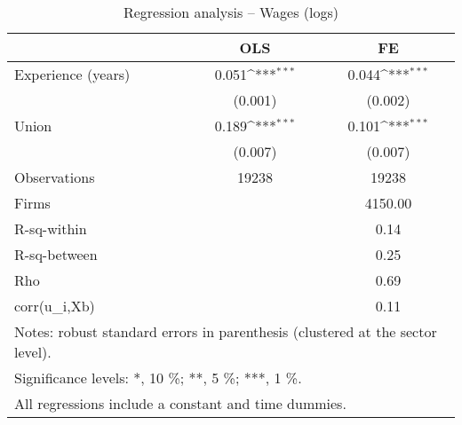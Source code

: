 \begin{table}[htbp]\centering
\def\sym#1{\ifmmode^{#1}\else\(^{#1}\)\fi}
\caption{Regression analysis -- Wages (logs)\label{tb:regresults}}
\begin{tabular}{l*{2}{c}}
\hline\hline
                    &         OLS         &          FE         \\
\hline
Experience (years)  &       0.051\sym{***}&       0.044\sym{***}\\
                    &     (0.001)         &     (0.002)         \\
[1em]
Union               &       0.189\sym{***}&       0.101\sym{***}\\
                    &     (0.007)         &     (0.007)         \\
\hline
Observations        &       19238         &       19238         \\
Firms               &                     &     4150.00         \\
R-sq-within         &                     &        0.14         \\
R-sq-between        &                     &        0.25         \\
Rho                 &                     &        0.69         \\
corr(u\_i,Xb)        &                     &        0.11         \\
\hline\hline
\multicolumn{3}{l}{\footnotesize Notes: robust standard errors in parenthesis (clustered at the sector level).}\\
\multicolumn{3}{l}{\footnotesize Significance levels: *, 10 \%; **, 5 \%; ***, 1 \%.}\\
\multicolumn{3}{l}{\footnotesize All regressions include a constant and time dummies.}\\
\end{tabular}
\end{table}
